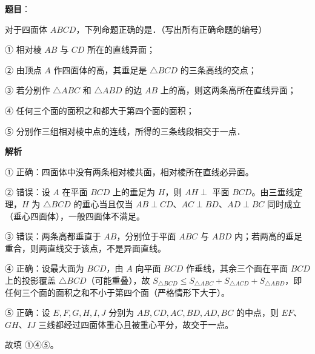 \begin{answer}

\textbf{题目}：

对于四面体 $ABCD$，下列命题正确的是\gkblank{}．（写出所有正确命题的编号）

① 相对棱 $AB$ 与 $CD$ 所在的直线异面；

② 由顶点 $A$ 作四面体的高，其垂足是 $\triangle BCD$ 的三条高线的交点；

③ 若分别作 $\triangle ABC$ 和 $\triangle ABD$ 的边 $AB$ 上的高，则这两条高所在直线异面；

④ 任何三个面的面积之和都大于第四个面的面积；

⑤ 分别作三组相对棱中点的连线，所得的三条线段相交于一点．

\textbf{解析}

① 正确：四面体中没有两条相对棱共面，相对棱所在直线必异面。

② 错误：设 $A$ 在平面 $BCD$ 上的垂足为 $H$，则 $AH\perp$ 平面 $BCD$。由三垂线定理，$H$ 为 $\triangle BCD$ 的垂心当且仅当 $AB\perp CD$、$AC\perp BD$、$AD\perp BC$ 同时成立（垂心四面体），一般四面体不满足。

③ 错误：两条高都垂直于 $AB$，分别位于平面 $ABC$ 与 $ABD$ 内；若两高的垂足重合，则两直线交于该点，不是异面直线。

④ 正确：设最大面为 $BCD$，由 $A$ 向平面 $BCD$ 作垂线，其余三个面在平面 $BCD$ 上的投影覆盖 $\triangle BCD$（可能重叠），故 $S_{\triangle BCD}\leqslant S_{\triangle ABC}+S_{\triangle ACD}+S_{\triangle ABD}$，即任何三个面的面积之和不小于第四个面（严格情形下大于）。

⑤ 正确：设 $E,F,G,H,I,J$ 分别为 $AB,CD,AC,BD,AD,BC$ 的中点，则 $EF$、$GH$、$IJ$ 三线都经过四面体重心且被重心平分，故交于一点。

故填 ①④⑤。


\end{answer}
